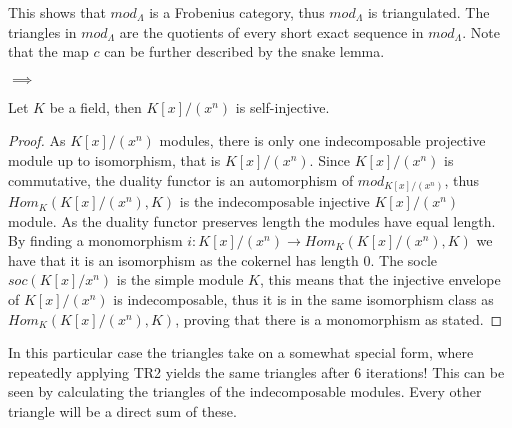    This shows that $mod_{\Lambda}$ is a Frobenius category, thus \underline{$mod_{\Lambda}$} is triangulated. The triangles in \underline{$mod_{\Lambda}$} are the quotients of every short exact sequence in $mod_{\Lambda}$. Note that the map $c$ can be further described by the snake lemma.
    \begin{center}
        $\implies$
    \end{center}



    \begin{prop}
        Let $K$ be a field, then $K[x]/(x^n)$ is self-injective.
    \end{prop}

    \begin{proof}
        As $K[x]/(x^n)$ modules, there is only one indecomposable projective module up to isomorphism, that is $K[x]/(x^n)$. Since $K[x]/(x^n)$ is commutative, the duality functor is an automorphism of $mod_{K[x]/(x^n)}$, thus $Hom_K(K[x]/(x^n),K)$ is the indecomposable injective $K[x]/(x^n)$ module. As the duality functor preserves length the modules have equal length. By finding a monomorphism $i:K[x]/(x^n)\rightarrow Hom_K(K[x]/(x^n),K)$ we have that it is an isomorphism as the cokernel has length $0$. The socle $soc(K[x]/x^n)$ is the simple module $K$, this means that the injective envelope of $K[x]/(x^n)$ is indecomposable, thus it is in the same isomorphism class as $Hom_K(K[x]/(x^n),K)$, proving that there is a monomorphism as stated.
    \end{proof}

    In this particular case the triangles take on a somewhat special form, where repeatedly applying TR2 yields the same triangles after 6 iterations! This can be seen by calculating the triangles of the indecomposable modules. Every other triangle will be a direct sum of these.

